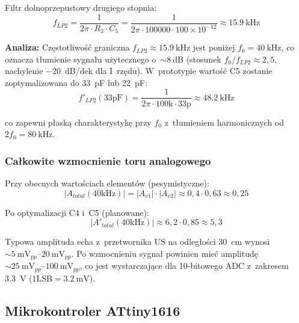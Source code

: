 \documentclass[a4paper,11pt]{article}
\begin{document}
Filtr dolnoprzepustowy drugiego stopnia:
\begin{equation}
    f_{LP2} = \frac{1}{2\pi \cdot R_3 \cdot C_5} = \frac{1}{2\pi \cdot 100000 \cdot 100 \times 10^{-12}} \approx \SI{15,9}{\kilo\hertz}
    \label{eq:flp2}
\end{equation}

\textbf{Analiza:} Częstotliwość graniczna $f_{LP2} \approx \SI{15,9}{\kilo\hertz}$
jest poniżej $f_0 = \SI{40}{\kilo\hertz}$, co oznacza tłumienie sygnału
użytecznego o~${\sim}\SI{8}{\deci\bel}$ (stosunek $f_0/f_{LP2} \approx 2{,}5$,
nachylenie \SI{-20}{\deci\bel}/dek dla I~rzędu). W~prototypie wartość C5
zostanie zoptymalizowana do \SI{33}{\pico\farad} lub \SI{22}{\pico\farad}:
\begin{equation}
    f'_{LP2}(33\text{pF}) = \frac{1}{2\pi \cdot 100\text{k} \cdot 33\text{p}} \approx \SI{48,2}{\kilo\hertz}
    \label{eq:flp2_opt}
\end{equation}

co zapewni płaską charakterystykę przy $f_0$ z~tłumieniem harmonicznych
od $2f_0 = \SI{80}{\kilo\hertz}$.

\subsubsection{Całkowite wzmocnienie toru analogowego}

Przy obecnych wartościach elementów (pesymistyczne):
\begin{equation}
    |A_{total}(40\text{kHz})| = |A_{v1}| \cdot |A_{v2}| \approx 0{,}4 \cdot 0{,}63 \approx 0{,}25
    \label{eq:gain_total_current}
\end{equation}

Po optymalizacji C4 i~C5 (planowane):
\begin{equation}
    |A'_{total}(40\text{kHz})| \approx 6{,}2 \cdot 0{,}85 \approx 5{,}3
    \label{eq:gain_total_opt}
\end{equation}

Typowa amplituda echa z~przetwornika US na odległości \SI{30}{\centi\metre}
wynosi ${\sim}\SIrange{5}{20}{\milli\volt_{pp}}$. Po wzmocnieniu sygnał
powinien mieć amplitudę ${\sim}\SIrange{25}{100}{\milli\volt_{pp}}$, co jest
wystarczające dla 10-bitowego ADC z~zakresem \SI{3,3}{\volt}
($1\text{LSB} = \SI{3,2}{\milli\volt}$).

\subsection{Mikrokontroler ATtiny1616}
\label{sec:mcu}
\end{document}
